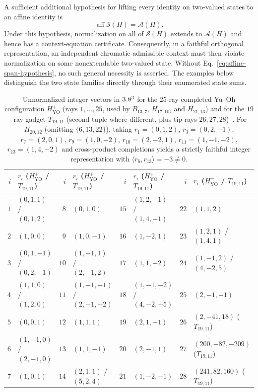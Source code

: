 \documentclass[aps,pra,reprint,superscriptaddress,longbibliography,nofootinbib,floatfix,10pt]{revtex4-2}
\theoremstyle{definition}\newtheorem{definition}[theorem]{Definition}
\theoremstyle{remark}\newtheorem{remark}[theorem]{Remark}
\newcommand{\Sc}{\mathcal S}\newcommand{\Cc}{\mathcal C}\newcommand{\Wc}{\mathcal W}
\newcommand{\YO}{\mathrm{YO}}\newcommand{\ip}[2]{\langle #1,#2\rangle}
\begin{document}
A sufficient additional hypothesis for lifting every identity on two-valued states to an affine identity is
\begin{equation}\label{eq:affine-span-hypothesis}
\operatorname{aff}\Sc(H)=\mathcal A(H).
\end{equation}
Under this hypothesis, normalization on all of $\Sc(H)$ extends to $\mathcal A(H)$ and hence has a context-equation certificate. Consequently, in a faithful orthogonal representation, an independent chromatic admissible context must then violate normalization on some nonextendable two-valued state. Without Eq.~\eqref{eq:affine-span-hypothesis}, no such general necessity is asserted. The examples below distinguish the two state families directly through their enumerated state sums.

\begin{table}[t]
\caption{Unnormalized integer vectors in $3.8^3$ for the $25$-ray completed Yu--Oh configuration $H_{\YO}^+$ (rays $1,\ldots,25$, used by $B_{13,7}$, $H_{17,10}$, and $H_{21,13}$) and for the $19$-ray gadget $T_{19,11}$ (second tuple where different, plus tip rays $26,27,28$)~\cite{svozil2026contexts,supplement}. For $H_{20,12}$ (omitting $\{6,13,22\}$), taking $r_1=(0,1,2)$, $r_3=(0,2,-1)$, $r_7=(2,0,1)$, $r_9=(1,0,-2)$, $r_{10}=(2,-2,1)$, $r_{11}=(1,-1,-2)$, $r_{13}=(1,4,-2)$ and cross-product completions yields a strictly faithful integer representation with $\ip{r_6}{r_{13}}=-3\neq 0$.}\label{tab:yo-vectors}
\footnotesize
\begin{ruledtabular}
\begin{tabular}{rl@{\quad}rl@{\quad}rl@{\quad}rl}
$i$ & $r_i$ ($H_{\YO}^+$ / $T_{19,11}$) & $i$ & $r_i$ ($H_{\YO}^+$ / $T_{19,11}$) & $i$ & $r_i$ ($H_{\YO}^+$ / $T_{19,11}$) & $i$ & $r_i$ ($H_{\YO}^+$ / $T_{19,11}$)\\\hline
$1$ & $(0,1,1)$ / $(0,1,2)$ & $8$ & $(0,1,0)$ & $15$ & $(1,2,-1)$ / $(1,4,-1)$ & $22$ & $(1,1,2)$\\
$2$ & $(1,0,0)$ & $9$ & $(1,0,-1)$ & $16$ & $(1,-2,1)$ & $23$ & $(1,2,1)$ / $(1,4,1)$\\
$3$ & $(0,1,-1)$ / $(0,2,-1)$ & $10$ & $(1,-1,1)$ / $(2,-1,2)$ & $17$ & $(1,1,-2)$ & $24$ & $(1,-1,2)$ / $(4,-2,5)$\\
$4$ & $(1,1,0)$ / $(1,2,0)$ & $11$ & $(1,-1,-1)$ / $(2,-1,-2)$ & $18$ & $(1,-1,-2)$ / $(4,-2,-5)$ & $25$ & $(2,-1,-1)$\\
$5$ & $(0,0,1)$ & $12$ & $(1,1,1)$ & $19$ & $(2,1,-1)$ & $26$ & $(2,-41,18)$ ($T_{19,11}$)\\
$6$ & $(1,-1,0)$ / $(2,-1,0)$ & $13$ & $(1,1,-1)$ & $20$ & $(2,-1,1)$ & $27$ & $(200,-82,-209)$ ($T_{19,11}$)\\
$7$ & $(1,0,1)$ & $14$ & $(2,1,1)$ / $(5,2,4)$ & $21$ & $(1,-2,-1)$ & $28$ & $(241,82,160)$ ($T_{19,11}$)\\
\end{tabular}
\end{ruledtabular}
\end{table}
\end{document}

